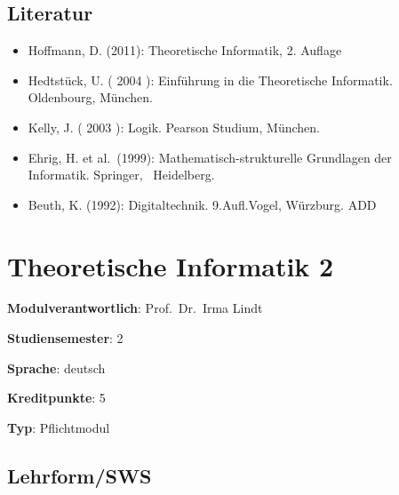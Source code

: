 \hypertarget{literaturpathlabelmi-2017modulbeschreibungen-bachelorba_theoretischeinformatik1}{%
\section*{Literatur\label{/mi-2017/modulbeschreibungen-bachelor/BA_TheoretischeInformatik1}}\label{literaturpathlabelmi-2017modulbeschreibungen-bachelorba_theoretischeinformatik1}}

\begin{itemize}
\tightlist
\item
  Hoffmann, D. (2011): Theoretische Informatik, 2. Auflage
\item
  Hedtstück, U. ( 2004 ): Einführung in die Theoretische Informatik.
  Oldenbourg, München.
\item
  Kelly, J. ( 2003 ): Logik. Pearson Studium, München.
\item
  Ehrig, H. et al.~(1999): Mathematisch-strukturelle Grundlagen der
  Informatik. Springer,~ Heidelberg.
\item
  Beuth, K. (1992): Digitaltechnik. 9.Aufl.Vogel, Würzburg. ADD
\end{itemize}

\hypertarget{theoretische-informatik-2pathlabelmi-2017modulbeschreibungen-bachelorba_theoretischeinformatik2}{%
\chapter{Theoretische Informatik
2\label{/mi-2017/modulbeschreibungen-bachelor/BA_TheoretischeInformatik2}}\label{theoretische-informatik-2pathlabelmi-2017modulbeschreibungen-bachelorba_theoretischeinformatik2}}

\begin{modulHead}
\textbf{Modulverantwortlich}: Prof.~Dr.~Irma
Lindt
\end{modulHead}
\begin{modulHead}
\textbf{Studiensemester}:
2
\end{modulHead}
\begin{modulHead}
\textbf{Sprache}:
deutsch
\end{modulHead}
\begin{modulHead}
\textbf{Kreditpunkte}:
5
\end{modulHead}
\begin{modulHead}
\textbf{Typ}:
Pflichtmodul
\end{modulHead}


\hypertarget{lehrformswspathlabelmi-2017modulbeschreibungen-bachelorba_theoretischeinformatik2}{%
\section*{Lehrform/SWS\label{/mi-2017/modulbeschreibungen-bachelor/BA_TheoretischeInformatik2}}\label{lehrformswspathlabelmi-2017modulbeschreibungen-bachelorba_theoretischeinformatik2}}

